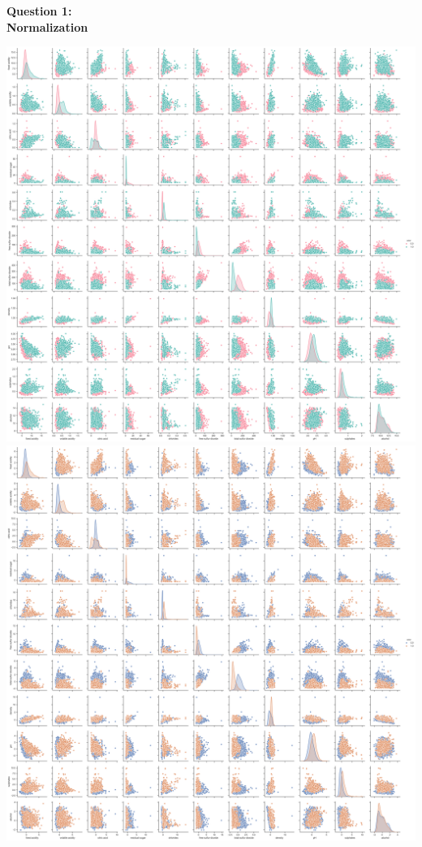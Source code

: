 \documentclass[12pt]{article}
\begin{document}
\noindent
\textbf{\large Question 1:}\\
\textbf{Normalization}
\begin{center}
    \includegraphics[width=17cm]{Q1_no_normalization.png}
    \includegraphics[width=17cm]{Q1_zscore_normalization.png}
\end{center}
\end{document}
